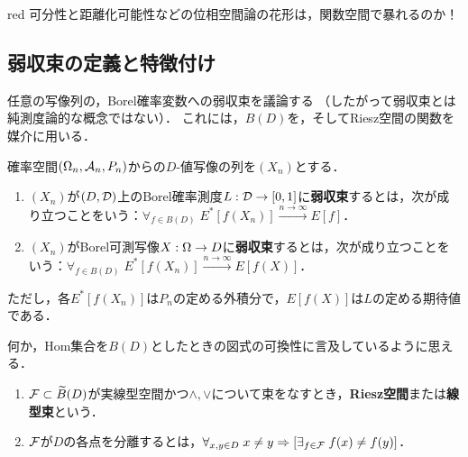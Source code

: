 \documentclass[uplatex,dvipdfmx]{jsreport}
\begin{document}
\begin{tbox}{red}{}
    可分性と距離化可能性などの位相空間論の花形は，関数空間で暴れるのか！
\end{tbox}

\subsection{弱収束の定義と特徴付け}

\begin{tcolorbox}[colframe=ForestGreen, colback=ForestGreen!10!white,breakable,colbacktitle=ForestGreen!40!white,coltitle=black,fonttitle=\bfseries\sffamily,
title=]
    任意の写像列の，Borel確率変数への弱収束を議論する
    （したがって弱収束とは純測度論的な概念ではない）．
    これには，$B(D)$を，そしてRiesz空間の関数を媒介に用いる．
\end{tcolorbox}

\begin{definition}
    確率空間$(\Omega_n,\mathcal{A}_n,P_n)$からの$D$-値写像の列を$(X_n)$とする．
    \begin{enumerate}
        \item $(X_n)$が$(D,\mathcal{D})$上のBorel確率測度$L:\mathcal{D}\to[0,1]$に\textbf{弱収束}するとは，次が成り立つことをいう：$\forall_{f\in B(D)}\;E^*[f(X_n)]\xrightarrow{n\to\infty}E[f]$．
        \item $(X_n)$がBorel可測写像$X:\Omega\to D$に\textbf{弱収束}するとは，次が成り立つことをいう：$\forall_{f\in B(D)}\;E^*[f(X_n)]\xrightarrow{n\to\infty}E[f(X)]$．
    \end{enumerate}
    ただし，各$E^*[f(X_n)]$は$P_n$の定める外積分で，$E[f(X)]$は$L$の定める期待値である．
\end{definition}
\begin{remark}
    何か，Hom集合を$B(D)$としたときの図式の可換性に言及しているように思える．
\end{remark}

\begin{definition}\mbox{}
    \begin{enumerate}
        \item $\mathcal{F}\subset\widetilde{B}(D)$が実線型空間かつ$\land,\lor$について束をなすとき，\textbf{Riesz空間}または\textbf{線型束}という．
        \item $\mathcal{F}$が$D$の各点を分離するとは，$\forall_{x,y\in D}\;x\ne y\Rightarrow[\exists_{f\in\mathcal{F}}\;f(x)\ne f(y)]$．
    \end{enumerate}
\end{definition}
\end{document}
